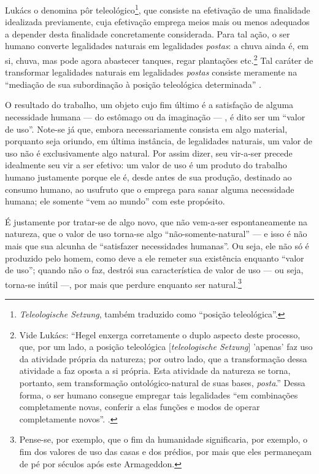 Lukács o denomina pôr teleológico\footnote{\textit{Teleologische Setzung}, também traduzido como ``posição teleológica''.}, que consiste na efetivação de uma finalidade idealizada previamente, cuja efetivação emprega meios mais ou menos adequados a depender desta finalidade concretamente considerada. Para tal ação, o ser humano converte legalidades naturais em legalidades \textit{postas}: a chuva ainda é, em si, chuva, mas pode agora abastecer tanques, regar plantações etc.\footnote{Vide Lukács: ``Hegel enxerga corretamente o duplo aspecto deste processo, que, por um lado, a posição teleológica [\textit{teleologische Setzung}] 'apenas' faz uso da atividade própria da natureza; por outro lado, que a transformação dessa atividade a faz oposta a si própria. Esta atividade da natureza se torna, portanto, sem transformação ontológico-natural de suas bases, \textit{posta}.'' Dessa forma, o ser humano consegue empregar tais legalidades ``em combinações completamente novas, conferir a elas funções e modos de operar completamente novos''. \parencite[p. 19-20, grifo meu]{Lukacs2018}.} Tal caráter de transformar legalidades naturais em legalidades \textit{postas} consiste meramente na ``mediação de sua subordinação à posição teleológica determinada'' \parencite[p. 20]{Lukacs2018}. 

O resultado do trabalho, um objeto cujo fim último é a satisfação de alguma necessidade humana — do estômago ou da imaginação — , é dito ser um ``valor de uso''. Note-se já que, embora necessariamente consista em algo material, porquanto seja oriundo, em última instância, de legalidades naturais, um valor de uso não é exclusivamente algo natural. Por assim dizer, seu vir-a-ser precede idealmente seu vir a ser efetivo: um valor de uso é um produto do trabalho humano justamente porque ele é, desde antes de sua produção, destinado ao consumo humano, ao usufruto que o emprega para sanar alguma necessidade humana; ele somente ``vem ao mundo'' com este propósito.

É justamente por tratar-se de algo novo, que não vem-a-ser espontaneamente na natureza, que o valor de uso torna-se algo ``não-somente-natural'' — e isso é não mais que sua alcunha de ``satisfazer necessidades humanas''. Ou seja, ele não só é produzido pelo homem, como deve a ele remeter sua existência enquanto ``valor de uso''; quando não o faz, destrói sua característica de valor de uso — ou seja, torna-se inútil —, por mais que perdure enquanto ser natural.\footnote{Pense-se, por exemplo, que o fim da humanidade significaria, por exemplo, o fim dos valores de uso das casas e dos prédios, por mais que eles permaneçam de pé por séculos após este Armageddon. }

